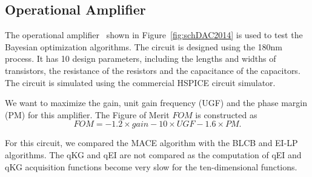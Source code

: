 
\subsection{Operational Amplifier}


The operational amplifier~\cite{wang2014enabling} shown in
Figure~\ref{fig:schDAC2014} is used to test the Bayesian optimization algorithms. The circuit is designed
using the 180nm process. It has 10 design parameters, including the lengths
and widths of transistors, the resistance of the resistors and the capacitance of the
capacitors. The circuit is simulated using the commercial HSPICE circuit simulator.

We want to maximize the gain, unit gain frequency (UGF) and the phase margin (PM) for this amplifier. The Figure of Merit $FOM$ is constructed as
$$
\mathit{FOM} = -1.2 \times \mathit{gain} - 10 \times \mathit{UGF} - 1.6 \times \mathit{PM}.
$$

For this circuit, we compared the MACE algorithm with the BLCB and EI-LP
algorithms. The qKG and qEI are not compared as the computation of qEI and qKG
acquisition functions become very slow for the ten-dimensional functions.


